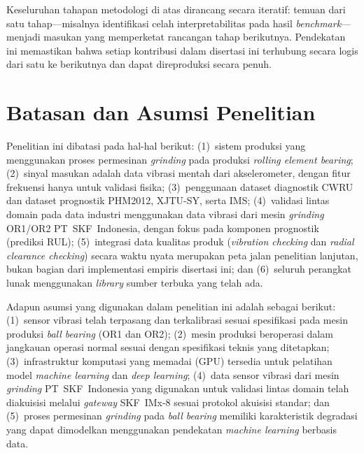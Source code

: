 Keseluruhan tahapan metodologi di atas dirancang secara iteratif: temuan
dari satu tahap---misalnya identifikasi celah interpretabilitas pada hasil
\emph{benchmark}---menjadi masukan yang memperketat rancangan tahap
berikutnya.
Pendekatan ini memastikan bahwa setiap kontribusi dalam disertasi ini
terhubung secara logis dari satu ke berikutnya dan dapat direproduksi
secara penuh.


\section{Batasan dan Asumsi Penelitian}
\label{sec:bab1_batasan}

Penelitian ini dibatasi pada hal-hal berikut: (1)~sistem produksi yang
menggunakan proses permesinan \emph{grinding} pada produksi
\emph{rolling element bearing}; (2)~sinyal masukan adalah data vibrasi
mentah dari akselerometer, dengan fitur frekuensi hanya untuk validasi
fisika; (3)~penggunaan dataset diagnostik CWRU dan dataset prognostik PHM2012,
XJTU-SY, serta IMS; {\color{blue}(4)~validasi lintas domain pada data
industri menggunakan data vibrasi dari mesin \emph{grinding} OR1/OR2
PT~SKF~Indonesia, dengan fokus pada komponen prognostik (prediksi RUL);}
(5)~integrasi data kualitas produk
(\emph{vibration checking} dan \emph{radial clearance checking})
secara waktu nyata merupakan peta jalan penelitian lanjutan, bukan
bagian dari implementasi empiris disertasi ini; dan (6)~seluruh
perangkat lunak menggunakan \emph{library} sumber terbuka yang
telah ada.

{\color{blue}Adapun asumsi yang digunakan dalam penelitian ini adalah
sebagai berikut:}
(1)~sensor vibrasi telah terpasang dan terkalibrasi sesuai spesifikasi pada
mesin produksi \emph{ball bearing} (OR1 dan OR2);
(2)~mesin produksi beroperasi dalam jangkauan operasi normal sesuai dengan
spesifikasi teknis yang ditetapkan;
(3)~infrastruktur komputasi yang memadai (GPU) tersedia untuk pelatihan
model \emph{machine learning} dan \emph{deep learning};
{\color{blue}(4)~data sensor vibrasi dari mesin \emph{grinding}
PT~SKF~Indonesia yang digunakan untuk validasi lintas domain telah diakuisisi
melalui \emph{gateway} SKF~IMx-8 sesuai protokol akuisisi standar}; dan
(5)~proses permesinan \emph{grinding} pada \emph{ball bearing} memiliki
karakteristik degradasi yang dapat dimodelkan menggunakan pendekatan
\emph{machine learning} berbasis data.


